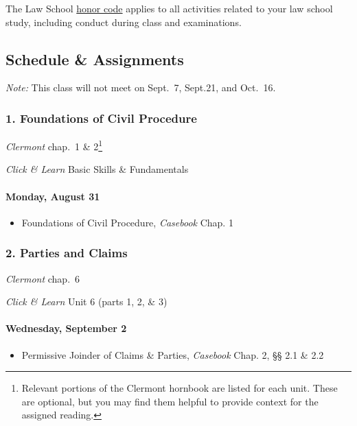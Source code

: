 \documentclass[11pt,letterpaper,twoside]{article}
\providecommand{\tightlist}{%
\setlength{\itemsep}{0em}\setlength{\parskip}{0em}\setlength{\itemindent}{0em}}
\begin{document}
The Law School
\href{https://www.elon.edu/u/law/students/honor-code/}{honor code}
applies to all activities related to your law school study, including
conduct during class and examinations.

\subsection*{Schedule \& Assignments}\label{schedule-assignments}

\emph{Note:} This class will not meet on Sept.~7, Sept.21, and Oct.~16.

\subsubsection{1. Foundations of Civil
Procedure}\label{foundations-of-civil-procedure}

\emph{Clermont} chap.~1 \& 2\footnote{Relevant portions of the Clermont
  hornbook are listed for each unit. These are optional, but you may
  find them helpful to provide context for the assigned reading.}

\emph{Click \& Learn} Basic Skills \& Fundamentals

\paragraph{Monday, August 31}\label{monday-august-31}

\begin{itemize}
\tightlist
\item
  Foundations of Civil Procedure, \emph{Casebook} Chap. 1
\end{itemize}

\subsubsection{2. Parties and Claims}\label{parties-and-claims}

\emph{Clermont} chap.~6

\emph{Click \& Learn} Unit 6 (parts 1, 2, \& 3)

\paragraph{Wednesday, September 2}\label{wednesday-september-2}

\begin{itemize}
\tightlist
\item
  Permissive Joinder of Claims \& Parties, \emph{Casebook} Chap. 2, §§
  2.1 \& 2.2
\end{itemize}
\end{document}
